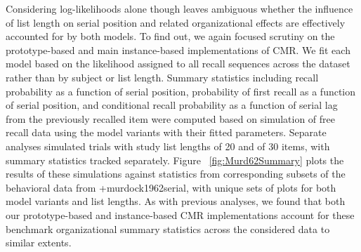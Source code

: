 {}Considering log-likelihoods alone though leaves ambiguous whether the influence of list length on serial position and related organizational effects are effectively accounted for by both models. To find out, we again focused scrutiny on the prototype-based and main instance-based implementations of CMR. We fit each model based on the likelihood assigned to all recall sequences across the dataset rather than by subject or list length. Summary statistics including recall probability as a function of serial position, probability of first recall as a function of serial position, and conditional recall probability as a function of serial lag from the previously recalled item were computed based on simulation of free recall data using the model variants with their fitted parameters. Separate analyses simulated trials with study list lengths of 20 and of 30 items, with summary statistics tracked separately. Figure ~\ref{fig:Murd62Summary} plots the results of these simulations against statistics from corresponding subsets of the behavioral data from +{}{}{murdock1962serial}, with unique sets of plots for both model variants and list lengths. As with previous analyses, we found that both our prototype-based and instance-based CMR implementations account for these benchmark organizational summary statistics across the considered data to similar extents.\relax